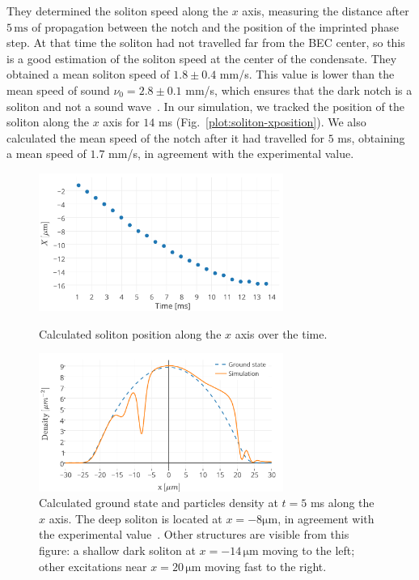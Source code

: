 They determined the soliton speed along the $x$ axis, measuring the distance after $5 \, \mathrm{ms}$ of propagation between the notch and the position of the imprinted phase step. At that time the soliton had not travelled far from the BEC center, so this is a good estimation of the soliton speed at the center of the condensate. They obtained a mean soliton speed of  $1.8 \pm 0.4$ mm/s. This value is lower than the mean speed of sound $\nu_0 = 2.8 \pm 0.1$ mm/s, which ensures that the dark notch is a soliton and not a sound wave~\citep{DSF00}. In our simulation, we tracked the position of the soliton along the $x$ axis for $14$ ms (Fig.~\ref{plot:soliton-xposition}). We also calculated the mean speed of the notch after it had travelled for $5$ ms, obtaining a mean speed of $1.7$ mm/s, in agreement with the experimental value.
\begin{figure}[h!]
    \centering
	\includegraphics[width=8cm]{Plots/soliton_track.pdf}
	\caption{Calculated soliton position along the $x$ axis over the time.} \label{plot:soliton-xposition}
	\includegraphics[width=8cm]{Plots/density_xprofile_5ms.pdf}
	\caption{Calculated ground state and particles density at $t = 5$ ms along the $x$ axis. The deep soliton is located at $x = -8 \mathrm{\mu m}$, in agreement with the experimental value~\citep{DSF00}. Other structures are visible from this figure: a shallow  dark soliton at $x = -14 \, \mathrm{\mu m}$ moving to the left; other excitations near $x = 20 \, \mathrm{\mu m}$ moving fast to the right.} \label{plot:density_5ms}
\end{figure}

